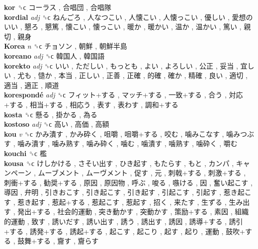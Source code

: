 \textbf{kor} ␝ϲ   コーラス ,  合唱団 ,  合唱隊   \\
\textbf{kordial} \emph{adj}  ␝ϲ   ねんごろ ,  人なつこい ,  人懐こい ,  人懐っこい ,  優しい ,  愛想のいい ,  懇ろ ,  懇篤 ,  懐こい ,  懐っこい ,  暖か ,  暖かい ,  温か ,  温かい ,  篤い ,  親切 ,  親身   \\
\textbf{Korea} \emph{n}  ␝ϲ   チョソン ,  朝鮮 ,  朝鮮半島   \\
\textbf{koreano} \emph{adj}  ␝ϲ   韓国人 ,  韓国語   \\
\textbf{korekto} \emph{adj}  ␝ϲ   いい ,  ただしい ,  もっとも ,  よい ,  よろしい ,  公正 ,  妥当 ,  宜しい ,  尤も ,  慥か ,  本当 ,  正しい ,  正善 ,  正確 ,  的確 ,  確か ,  精確 ,  良い ,  適切 ,  適当 ,  適正 ,  順道   \\
\textbf{korespondé} \emph{adj}  ␝ϲ   フィット+する ,  マッチ+する ,  一致+する ,  合う ,  対応+する ,  相当+する ,  相応う ,  表す ,  表わす ,  調和+する   \\
\textbf{kosta} ␝ϲ   懸る ,  掛かる ,  為る   \\
\textbf{kostoso} \emph{adj}  ␝ϲ   高い ,  高価 ,  高額   \\
\textbf{kou} \emph{v}  ␝ϲ   かみ潰す ,  かみ砕く ,  咀嚼 ,  咀嚼+する ,  咬む ,  噛みこなす ,  噛みつぶす ,  噛み潰す ,  噛み熟す ,  噛み砕く ,  噛む ,  噛潰す ,  噛熟す ,  噛砕く ,  嚼む   \\
\textbf{kouchi} ␝ϲ   檻   \\
\textbf{kousa} ␝ϲ   けしかける ,  さそい出す ,  ひき起す ,  もたらす ,  もと ,  カンパ ,  キャンペーン ,  ムーブメント ,  ムーヴメント ,  促す ,  元 ,  刺戟+する ,  刺激+する ,  刺衝+する ,  勧奨+する ,  原因 ,  原因物 ,  呼ぶ ,  唆る ,  嗾ける ,  因 ,  奮い起こす ,  導因 ,  弁明 ,  引きおこす ,  引き起こす ,  引き起す ,  引起こす ,  引起す ,  惹き起こす ,  惹き起す ,  惹起+する ,  惹起こす ,  惹起す ,  招く ,  来たす ,  生ずる ,  生み出す ,  発出+する ,  社会的運動 ,  突き動かす ,  突動かす ,  策励+する ,  素因 ,  組織的運動 ,  致す ,  誘いだす ,  誘い出す ,  誘う ,  誘出す ,  誘因 ,  誘導+する ,  誘引+する ,  誘発+する ,  誘起+する ,  起こす ,  起こり ,  起す ,  起り ,  運動 ,  鼓吹+する ,  鼓舞+する ,  齎す ,  齎らす   \\
